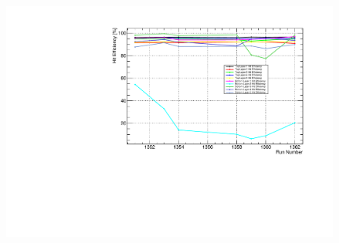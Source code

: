 
%
%


\begin{figure}[h]
    \begin{center}
    	\includegraphics[width=0.98\textwidth]{test2012/svtperformance/trk_performance/hit_efficiency_vs_rn.pdf}
        \caption{} 
	\label{fig:hit_efficiency}
    \end{center}
\end{figure}
